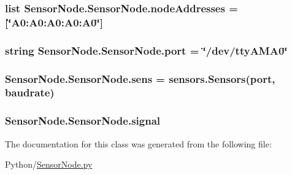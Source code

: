\subsubsection[{\texorpdfstring{node\+Addresses}{nodeAddresses}}]{\setlength{\rightskip}{0pt plus 5cm}list Sensor\+Node.\+Sensor\+Node.\+node\+Addresses = \mbox{[}\char`\"{}A0\+:\+A0\+:\+A0\+:\+A0\+:\+A0\char`\"{}\mbox{]}\hspace{0.3cm}{\ttfamily [static]}}\hypertarget{classSensorNode_1_1SensorNode_a17be4a277b9bfdd041ec006b462d497c}{}\label{classSensorNode_1_1SensorNode_a17be4a277b9bfdd041ec006b462d497c}
\subsubsection[{\texorpdfstring{port}{port}}]{\setlength{\rightskip}{0pt plus 5cm}string Sensor\+Node.\+Sensor\+Node.\+port = \char`\"{}/dev/tty\+A\+M\+A0\char`\"{}\hspace{0.3cm}{\ttfamily [static]}}\hypertarget{classSensorNode_1_1SensorNode_a94712cd1b0bf09fa4cd3de94ca666575}{}\label{classSensorNode_1_1SensorNode_a94712cd1b0bf09fa4cd3de94ca666575}
\subsubsection[{\texorpdfstring{sens}{sens}}]{\setlength{\rightskip}{0pt plus 5cm}Sensor\+Node.\+Sensor\+Node.\+sens = {\bf sensors.\+Sensors}({\bf port}, {\bf baudrate})\hspace{0.3cm}{\ttfamily [static]}}\hypertarget{classSensorNode_1_1SensorNode_ad8aec254c15c97a8b5c709480f31b2bb}{}\label{classSensorNode_1_1SensorNode_ad8aec254c15c97a8b5c709480f31b2bb}
\subsubsection[{\texorpdfstring{signal}{signal}}]{\setlength{\rightskip}{0pt plus 5cm}Sensor\+Node.\+Sensor\+Node.\+signal\hspace{0.3cm}{\ttfamily [static]}}\hypertarget{classSensorNode_1_1SensorNode_a983f7af590b412918b4e0113af0388d3}{}\label{classSensorNode_1_1SensorNode_a983f7af590b412918b4e0113af0388d3}


The documentation for this class was generated from the following file\+:\begin{DoxyCompactItemize}
\item 
Python/\hyperlink{SensorNode_8py}{Sensor\+Node.\+py}\end{DoxyCompactItemize}
